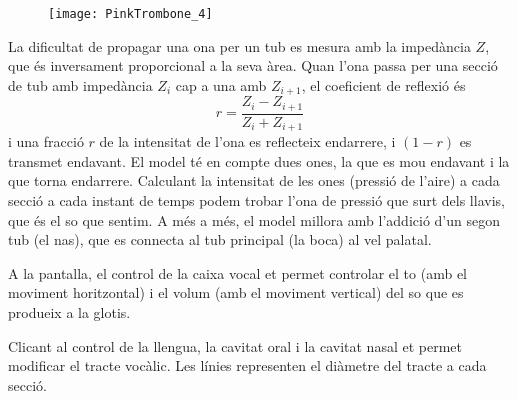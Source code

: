 \begin{figure}[h]
\centering
\texttt{[image: PinkTrombone\_4]}
\end{figure}

La dificultat de propagar una ona per un tub es mesura amb la impedància $Z$, que és inversament proporcional a la seva àrea. Quan l'ona passa per una secció de tub amb impedància $Z_i$ cap a una amb $Z_{i+1}$, el coeficient de reflexió és
$$r=\frac{Z_i - Z_{i+1}}{Z_i + Z_{i+1}}$$
i una fracció $r$ de la intensitat de l'ona es reflecteix endarrere, i $(1-r)$ es transmet endavant. El model té en compte dues ones, la que es mou endavant i la que torna endarrere. Calculant la intensitat de les ones (pressió de l'aire) a cada secció a cada instant de temps podem trobar l'ona de pressió que surt dels llavis, que és el so que sentim. A més a més, el model millora amb l'addició d'un segon tub (el nas), que es connecta al tub principal (la boca) al vel palatal.

A la pantalla, el control de la caixa vocal et permet controlar el to (amb el moviment horitzontal) i el volum (amb el moviment vertical) del so que es produeix a la glotis.

Clicant al control de la llengua, la cavitat oral i la cavitat nasal et permet modificar el tracte vocàlic. Les línies representen el diàmetre del tracte a cada secció.


